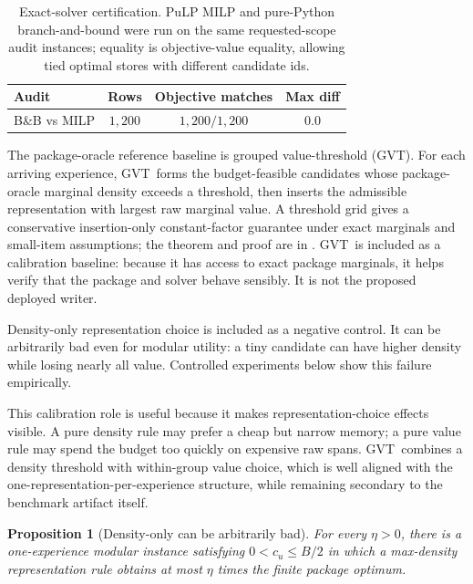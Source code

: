 \documentclass{article}
\newtheorem{proposition}[theorem]{Proposition}
\theoremstyle{remark}
\theoremstyle{plain}
\newcommand{\compiler}{\textsc{GVT}}
\newcommand{\budget}{B}
\begin{document}
\begin{table}[h]
\centering
\small
\caption{Exact-solver certification. PuLP MILP and pure-Python branch-and-bound were run on the same requested-scope audit instances; equality is objective-value equality, allowing tied optimal stores with different candidate ids.}
\label{tab:milp}
\begin{tabular}{lccc}
\toprule
Audit & Rows & Objective matches & Max diff \\
\midrule
B\&B vs MILP & $1{,}200$ & $1{,}200/1{,}200$ & $0.0$ \\
\bottomrule
\end{tabular}
\end{table}

The package-oracle reference baseline is grouped value-threshold (\compiler). For each arriving experience, \compiler\ forms the budget-feasible candidates whose package-oracle marginal density exceeds a threshold, then inserts the admissible representation with largest raw marginal value. A threshold grid gives a conservative insertion-only constant-factor guarantee under exact marginals and small-item assumptions; the theorem and proof are in . \compiler\ is included as a calibration baseline: because it has access to exact package marginals, it helps verify that the package and solver behave sensibly. It is not the proposed deployed writer.

Density-only representation choice is included as a negative control. It can be arbitrarily bad even for modular utility: a tiny candidate can have higher density while losing nearly all value. Controlled experiments below show this failure empirically.

This calibration role is useful because it makes representation-choice effects visible. A pure density rule may prefer a cheap but narrow memory; a pure value rule may spend the budget too quickly on expensive raw spans. \compiler\ combines a density threshold with within-group value choice, which is well aligned with the one-representation-per-experience structure, while remaining secondary to the benchmark artifact itself.

\begin{proposition}[Density-only can be arbitrarily bad]\label{prop:density-bad}
For every $\eta>0$, there is a one-experience modular instance satisfying $0<c_u\leq\budget/2$ in which a max-density representation rule obtains at most $\eta$ times the finite package optimum.
\end{proposition}
\end{document}
